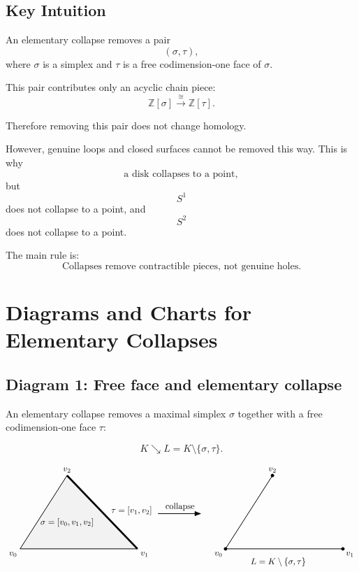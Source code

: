 \documentclass[12pt,a4paper]{article}
\theoremstyle{notespace}
\begin{document}
\subsection{Key Intuition}

An elementary collapse removes a pair
\[
(\sigma,\tau),
\]
where \(\sigma\) is a simplex and \(\tau\) is a free codimension-one face of \(\sigma\).

This pair contributes only an acyclic chain piece:
\[
\mathbb Z[\sigma]\xrightarrow{\cong}\mathbb Z[\tau].
\]

Therefore removing this pair does not change homology.

However, genuine loops and closed surfaces cannot be removed this way. This is why
\[
\text{a disk collapses to a point},
\]
but
\[
S^1
\]
does not collapse to a point, and
\[
S^2
\]
does not collapse to a point.

The main rule is:
\[
\boxed{
	\text{Collapses remove contractible pieces, not genuine holes.}
}
\]

\section{Diagrams and Charts for Elementary Collapses}

\subsection{Diagram 1: Free face and elementary collapse}

An elementary collapse removes a maximal simplex \(\sigma\) together with a free codimension-one face \(\tau\):

\[
K\searrow L=K\setminus\{\sigma,\tau\}.
\]

\[
\begin{tikzpicture}[scale=1.2]
	\coordinate (A) at (0,0);
	\coordinate (B) at (4,0);
	\coordinate (C) at (1.6,2.5);
	
	\fill[gray!10] (A)--(B)--(C)--cycle;
	\draw[thick] (A)--(B)--(C)--cycle;
	
	\draw[line width=2.2pt] (B)--(C);
	
	\node[below left] at (A) {$v_0$};
	\node[below right] at (B) {$v_1$};
	\node[above] at (C) {$v_2$};
	
	\node at (1.6,0.9) {$\sigma=[v_0,v_1,v_2]$};
	\node[right] at (3.0,1.3) {$\tau=[v_1,v_2]$};
	
	\draw[-{Latex[length=3mm]},thick] (4.7,1.2)--(6.2,1.2);
	\node[above] at (5.45,1.2) {$\text{collapse}$};
	
	\coordinate (A2) at (7,0);
	\coordinate (B2) at (11,0);
	\coordinate (C2) at (8.6,2.5);
	
	\draw[thick] (A2)--(B2);
	\draw[thick] (A2)--(C2);
	\filldraw (A2) circle (1.5pt);
	\filldraw (B2) circle (1.5pt);
	\filldraw (C2) circle (1.5pt);
	
	\node[below left] at (A2) {$v_0$};
	\node[below right] at (B2) {$v_1$};
	\node[above] at (C2) {$v_2$};
	
	\node at (8.8,-0.45) {$L=K\setminus\{\sigma,\tau\}$};
\end{tikzpicture}
\]
\end{document}
